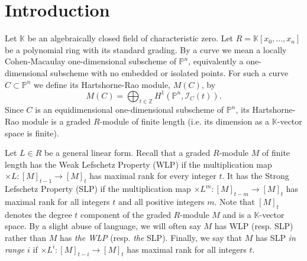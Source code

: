 \documentclass[12pt]{amsart}%
\numberwithin{equation}{section}
\theoremstyle{definition}
\numberwithin{equation}{section}
\newcommand{\ZZ}{ \ensuremath{\mathbb{Z}}}
\newcommand{\PP}{ \ensuremath{\mathbb{P}}}
\begin{document}
\author[E.T. Turatti]{Ettore Teixeira Turatti}
\address[E.T. Turatti]{Faculty of Mathematics, Informatics, and Mechanics, University of Warsaw, Banacha 2, 02-097 Warsaw, Poland}




\maketitle

\tableofcontents

\section{Introduction}


Let $\mathbb K$ be an algebraically closed field of characteristic zero. Let $R = \mathbb K[x_0,\dots,x_n]$ be a polynomial ring with its standard grading. By a curve we mean a locally Cohen-Macaulay one-dimensional subscheme of $\mathbb P^n$, equivalently a one-dimensional subscheme with no embedded or isolated points. For such a curve $C \subset \PP^n$ we define its Hartshorne-Rao module, $M(C)$, by
\[
M(C) = \bigoplus_{t \in \ZZ} H^1(\mathbb P^n,\mathcal I_C(t)).
\]
Since $C$ is an equidimensional one-dimensional subscheme of $\PP^n$, its Hartshorne-Rao module is a graded $R$-module of finite length (i.e. its dimension as a $\mathbb K$-vector space is finite).

Let $L \in R$ be a general linear form. Recall that a graded $R$-module $M$ of finite length has the Weak Lefschetz Property (WLP) if the multiplication map $\times L \colon [M]_{t-1} \rightarrow [M]_t$ has maximal rank for every integer $t$. It has the Strong Lefschetz Property (SLP) if the multiplication map $\times L^m \colon [M]_{t-m} \rightarrow [M]_t$ has maximal rank for all integers $t$ and all positive integers $m$. Note that $[M]_t$ denotes the degree $t$ component of the graded $R$-module $M$ and is a $\mathbb K$-vector space. By a slight abuse of language, we will often say $M$ has WLP (resp. SLP) rather than $M$ has {\it the WLP} (resp. {\it the} SLP). {Finally, we say that $M$ has SLP {\it in range $i$} if $\times L^i \colon [M]_{t-i} \rightarrow [M]_t$ has maximal rank for all integers $t$.} 
\end{document}
